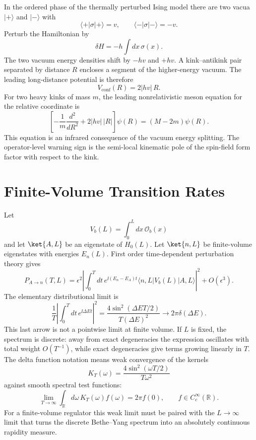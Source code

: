 \begin{example}
\label{ex:ising-magnetic-kink-confinement}
In the ordered phase of the thermally perturbed Ising model there are two
vacua \(|+\rangle\) and \(|-\rangle\) with
\[
  \langle+\!|\sigma|+\rangle=v,\qquad
  \langle-\!|\sigma|-\rangle=-v .
\]
Perturb the Hamiltonian by
\[
  \delta H=-h\int dx\,\sigma(x).
\]
The two vacuum energy densities shift by \(-hv\) and \(+hv\).  A kink--antikink
pair separated by distance \(R\) encloses a segment of the higher-energy
vacuum.  The leading long-distance potential is therefore
\[
  V_{\mathrm{conf}}(R)=2|hv|\,R .
\]
For two heavy kinks of mass \(m\), the leading nonrelativistic meson equation
for the relative coordinate is
\[
  \left[
  -\frac1m\frac{d^2}{dR^2}
  +2|hv|\,|R|
  \right]\psi(R)
  =
  (M-2m)\psi(R).
\]
This equation is an infrared consequence of the vacuum energy splitting.  The
operator-level warning sign is the semi-local kinematic pole of the spin-field
form factor with respect to the kink.
\end{example}

\section{Finite-Volume Transition Rates}

Let
\[
  V_b(L)=\int_0^L dx\,\mathcal O_b(x)
\]
and let \(\ket{A,L}\) be an eigenstate of \(H_0(L)\).  Let
\(\ket{n,L}\) be finite-volume eigenstates with energies \(E_n(L)\).  First
order time-dependent perturbation theory gives
\[
  P_{A\to n}(T,L)
  =
  \epsilon^2
  \left|
    \int_0^T dt\,e^{\ii(E_n-E_A)t}
    \langle n,L|V_b(L)|A,L\rangle
  \right|^2
  +
  O(\epsilon^3).
\]
The elementary distributional limit is
\[
  \frac1T
  \left|\int_0^Tdt\,e^{\ii\Delta E t}\right|^2
  =
  \frac{4\sin^2(\Delta E T/2)}{T(\Delta E)^2}
  \longrightarrow
  2\pi\delta(\Delta E).
\]
This last arrow is not a pointwise limit at finite volume.  If \(L\) is fixed,
the spectrum is discrete: away from exact degeneracies the expression
oscillates with total weight \(O(T^{-1})\), while exact degeneracies give
terms growing linearly in \(T\).  The delta function notation means weak
convergence of the kernels
\[
  K_T(\omega)=\frac{4\sin^2(\omega T/2)}{T\omega^2}
\]
against smooth spectral test functions:
\[
  \lim_{T\to\infty}\int_{\mathbb R}d\omega\,K_T(\omega)f(\omega)
  =
  2\pi f(0),
  \qquad f\in C_c^\infty(\mathbb R).
\]
For a finite-volume regulator this weak limit must be paired with the
\(L\to\infty\) limit that turns the discrete Bethe--Yang spectrum into an
absolutely continuous rapidity measure.

